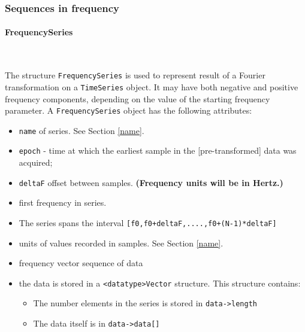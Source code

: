 \documentclass[]{ligodcc}
\renewcommand{\texttt}[1]{{\ttfamily\color{blue}#1}}
\begin{document}
\subsubsection{Sequences in frequency}

\paragraph{{\texttt {FrequencySeries}} }~


The structure {\tt FrequencySeries} is used to represent result of a Fourier
transformation on a {\tt TimeSeries} object. It may have both negative and
positive frequency components, depending on the value of the starting
frequency parameter. A {\tt FrequencySeries} object has the following
attributes:

\begin{itemize}
\vspace{-0.15in}
\item
{\tt name} of series. See Section \ref{name}.
\vspace{-0.15in}
\item
{\tt epoch} - time at which the earliest sample in
the [pre-transformed] data was acquired;
\vspace{-0.15in}
\item
{\tt deltaF} offset between samples.  {\bf (Frequency units will be in Hertz.)}
\vspace{-0.15in}
\item
first frequency in series.
\vspace{-0.15in}
\item
The series spans the interval {\tt [f0,f0+deltaF,....,f0+(N-1)*deltaF] }
\vspace{-0.15in}
\item
units of values recorded in samples. See Section \ref{name}.
\vspace{-0.15in}
\item
frequency vector sequence of data
\vspace{-0.15in}
\item
the data is stored in a {\tt <datatype>Vector}  structure. This structure contains:
\begin{itemize}
\vspace{-0.10in}
\item
The number elements in the series is stored in {\tt data->length}
\vspace{-0.10in}
\item
The data itself is in {\tt data->data[]}
\end{itemize}
\end{itemize}
\end{document}
